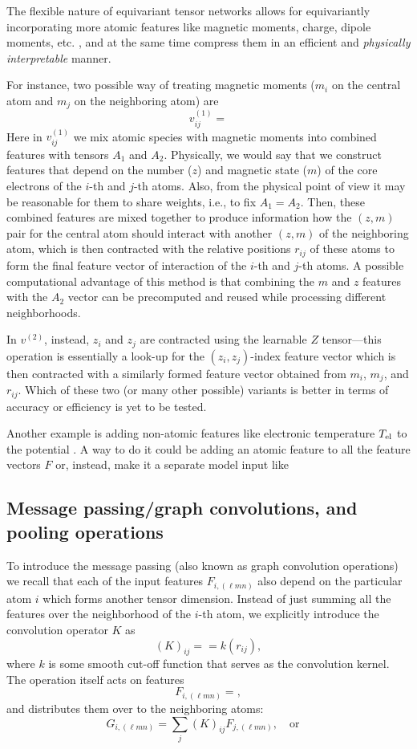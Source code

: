 The flexible nature of equivariant tensor networks allows for equivariantly incorporating more atomic features like magnetic moments, charge, dipole moments, etc. \citep{drautz_atomic_2020,novikov_magnetic_2022}, and at the same time compress them in an efficient and \emph{physically interpretable} manner.

For instance, two possible way of treating magnetic moments ($m_i$ on the central atom and $m_j$ on the neighboring atom) are
\[
v^{(1)}_{ij} =
\]
Here in $v^{(1)}_{ij}$ we mix atomic species with magnetic moments into combined features with tensors $A_1$ and $A_2$.
Physically, we would say that we construct features that depend on the number ($z$) and magnetic state ($m$) of the core electrons of the $i$-th and $j$-th atoms.
Also, from the physical point of view it may be reasonable for them to share weights, i.e., to fix $A_1 = A_2$.
Then, these combined features are mixed together to produce information how the $(z,m)$ pair for the central atom should interact with another $(z,m)$ of the neighboring atom, which is then contracted with the relative positions $r_{ij}$ of these atoms to form the final feature vector of interaction of the $i$-th and $j$-th atoms.
A possible computational advantage of this method is that combining the $m$ and $z$ features with the $A_2$ vector can be precomputed and reused while processing different neighborhoods.

In $v^{(2)}$, instead, $z_i$ and $z_j$ are contracted using the learnable $Z$ tensor---this operation is essentially a look-up for the $(z_i, z_j)$-index feature vector which is then contracted with a similarly formed feature vector obtained from $m_i$, $m_j$, and $r_{ij}$.
Which of these two (or many other possible) variants is better in terms of accuracy or efficiency is yet to be tested.

Another example is adding non-atomic features like electronic temperature $T_{\rm el}$ to the potential \cite{zhang2020-DeepMD-temp,lopanitsyna2021-temp,ellis2021-temp}.
A way to do it could be adding an atomic feature to all the feature vectors $F$ or, instead, make it a separate model input like

\subsection{Message passing/graph convolutions, and pooling operations}

To introduce the message passing (also known as graph convolution operations) \citep{schutt_quantumchemical_2017,batzner_equivariant_2022,batatia_mace_2022} we recall that each of the input features $F_{i, (\ell m n)}$ also depend on the particular atom $i$ which forms another tensor dimension.
Instead of just summing all the features over the neighborhood of the $i$-th atom, we explicitly introduce the convolution operator $K$ as
\[
(K)_{ij}
=
= k(r_{ij}),
\]
where $k$ is some smooth cut-off function that serves as the convolution kernel.
The operation itself acts on features
\[
F_{i,(\ell m n)}
=
,
\]
and distributes them over to the neighboring atoms:
\[
G_{i,(\ell mn)} = \sum_j (K)_{ij} F_{j,(\ell mn)},
\quad\text{or}\quad
\]

